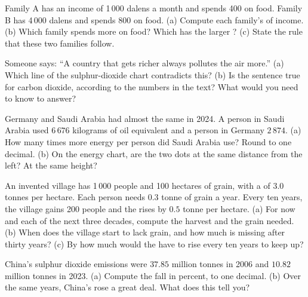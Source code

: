 \begin{exercise}[$\star\star$]\label{exo:g6:food-and-energy:7}
Family A has an income of 1\,000 dalens a month and spends 400 on food. Family B
has 4\,000 dalens and spends 800 on food. (a) Compute each family's  of
income. (b) Which family spends more on food? Which has the larger ?
(c) State the rule that these two families follow.
\end{exercise}

\begin{exercise}[$\star\star$]\label{exo:g6:food-and-energy:8}
Someone says: ``A country that gets richer always pollutes the air more.''
(a) Which line of the sulphur-dioxide chart contradicts this? (b) Is the sentence
true for carbon dioxide, according to the numbers in the text? What would you need
to know to answer?
\end{exercise}

\begin{exercise}[$\star\star$]\label{exo:g6:food-and-energy:9}
Germany and Saudi Arabia had almost the same  in 2024. A person in
Saudi Arabia used $6\,676$ kilograms of oil equivalent and a person in Germany
$2\,874$. (a) How many times more energy per person did Saudi Arabia use? Round to
one decimal. (b) On the energy chart, are the two dots at the same distance from the
left? At the same height?
\end{exercise}

\begin{exercise}[$\star\star\star$]\label{exo:g6:food-and-energy:10}
An invented village has 1\,000 people and 100 hectares of grain, with a  of
$3.0$ tonnes per hectare. Each person needs $0.3$ tonne of grain a year. Every ten
years, the village gains 200 people and the  rises by $0.5$ tonne per hectare.
(a) For now and each of the next three decades, compute the harvest and the grain
needed. (b) When does the village start to lack grain, and how much is missing
after thirty years? (c) By how much would the  have to rise every ten years to
keep up?
\end{exercise}

\begin{exercise}[$\star\star\star$]\label{exo:g6:food-and-energy:11}
China's sulphur dioxide emissions were $37.85$ million tonnes in 2006 and $10.82$
million tonnes in 2023. (a) Compute the fall in percent, to one decimal. (b) Over
the same years, China's  rose a great deal. What does this tell
you?
\end{exercise}

